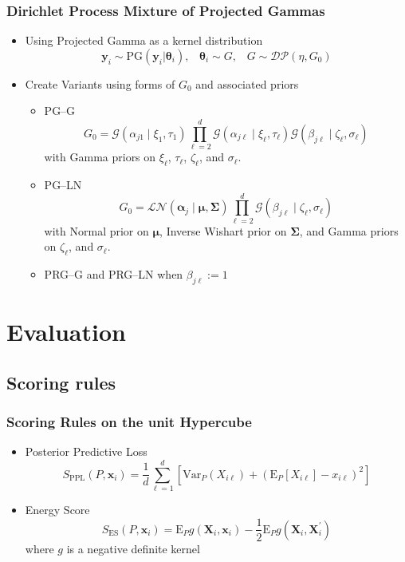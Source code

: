 \documentclass[aspectratio=169]{beamer}
\begin{document}
\begin{frame}
  \frametitle{Dirichlet Process Mixture of Projected Gammas}
  \begin{itemize}
    \item Using Projected Gamma as a kernel distribution
      \[
       \bm{y}_i \sim \text{PG}(\bm{y}_i|\bm{\theta}_i) , \;\;\; \bm{\theta}_i \sim G, \;\;\; G \sim \mathcal{DP}(\eta, G_0)
      \]
    \item Create Variants using forms of $G_0$ and associated priors
      \begin{itemize}
        \item PG--G
          \[
            G_0 = \mathcal{G}(\alpha_{j1}\mid\xi_1,\tau_1)\prod_{\ell = 2}^d\mathcal{G}(\alpha_{j\ell}\mid\xi_\ell,\tau_\ell)\mathcal{G}(\beta_{j\ell}\mid\zeta_\ell,\sigma_{\ell})
          \]
          with Gamma priors on $\xi_\ell$, $\tau_{\ell}$, $\zeta_{\ell}$, and $\sigma_{\ell}$.
        \item PG--LN
          \[
            G_0 = \mathcal{LN}(\bm{\alpha}_j\mid \bm{\mu},\bm{\Sigma})\prod_{\ell = 2}^d\mathcal{G}(\beta_{j\ell}\mid\zeta_{\ell},\sigma_{\ell})
          \]
          with Normal prior on $\bm{\mu}$, Inverse Wishart prior on $\bm{\Sigma}$, and Gamma priors on $\zeta_{\ell}$, and $\sigma_{\ell}$.
        \item PRG--G and PRG--LN when $\beta_{j\ell} := 1$
      \end{itemize}
  \end{itemize}
\end{frame}

\section{Evaluation}
\subsection{Scoring rules}
\begin{frame}
  \frametitle{Scoring Rules on the unit Hypercube}
  \begin{itemize}
    \item Posterior Predictive Loss
      \[
        S_{\text{PPL}}\left(P,\bm{x}_i\right) =
          \frac{1}{d}\sum_{\ell = 1}^d\left[\text{Var}_P\left(X_{i\ell}\right) +
          \left(\text{E}_P\left[X_{i\ell}\right] - x_{i\ell}\right)^2\right]
      \]
    \pause
    \item Energy Score
      \[
        S_{\text{ES}}\left(P, \bm{x}_i\right) =
          \text{E}_P g\left(\bm{X}_i, \bm{x}_i\right) -
          \frac{1}{2}\text{E}_P g\left(\bm{X}_i,\bm{X}_i^{\prime}\right)
      \]
      where $g$ is a negative definite kernel
  \end{itemize}
\end{frame}
\end{document}
